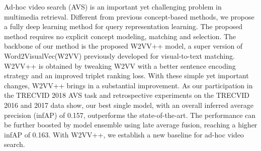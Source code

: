 \begin{abstracten}
    Ad-hoc video search (AVS) is an important yet challenging problem in multimedia retrieval. Different from previous concept-based methods, we propose a fully deep learning method for query representation learning. The proposed method requires no explicit concept modeling, matching and selection. The backbone of our method is the proposed W2VV++ model, a super version of Word2VisualVec(W2VV) previously developed for visual-to-text matching. W2VV++ is obtained by tweaking W2VV with a better sentence encoding strategy and an improved triplet ranking loss. With these simple yet important changes, W2VV++ brings in a substantial improvement. As our participation in the TRECVID 2018 AVS task and retrospective experiments on the TRECVID 2016 and 2017 data show, our best single model, with an overall inferred average precision (infAP) of 0.157, outperforms the state-of-the-art. The performance can be further boosted by model ensemble using late average fusion, reaching a higher infAP of 0.163. With W2VV++, we establish a new baseline for ad-hoc video search.

\end{abstracten}
